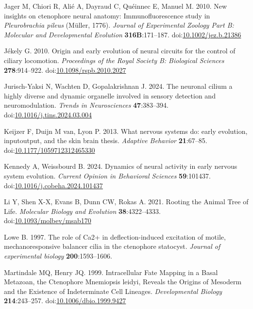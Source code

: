 \documentclass[
  11pt,
]{article}
\newlength{\cslhangindent}
\newenvironment{CSLReferences}[2] %
 {\begin{list}{}{%
  \setlength{\itemindent}{0pt}
  \setlength{\leftmargin}{0pt}
  \setlength{\parsep}{0pt}
  \ifodd #1
   \setlength{\leftmargin}{\cslhangindent}
   \setlength{\itemindent}{-1\cslhangindent}
  \fi
  \setlength{\itemsep}{#2\baselineskip}}}
 {\end{list}}
\begin{document}
\begin{CSLReferences}{1}{0}
Jager M, Chiori R, Alié A, Dayraud C, Quéinnec E, Manuel M. 2010. New
insights on ctenophore neural anatomy: Immunofluorescence study in
{\emph{Pleurobrachia pileus}} (Müller, 1776). \emph{Journal of
Experimental Zoology Part B: Molecular and Developmental Evolution}
\textbf{316B}:171--187.
doi:\href{https://doi.org/10.1002/jez.b.21386}{10.1002/jez.b.21386}

Jékely G. 2010. Origin and early evolution of neural circuits for the
control of ciliary locomotion. \emph{Proceedings of the Royal Society B:
Biological Sciences} \textbf{278}:914--922.
doi:\href{https://doi.org/10.1098/rspb.2010.2027}{10.1098/rspb.2010.2027}

Jurisch-Yaksi N, Wachten D, Gopalakrishnan J. 2024. The neuronal cilium
{\textendash} a highly diverse and dynamic organelle involved in sensory
detection and neuromodulation. \emph{Trends in Neurosciences}
\textbf{47}:383--394.
doi:\href{https://doi.org/10.1016/j.tins.2024.03.004}{10.1016/j.tins.2024.03.004}

Keijzer F, Duijn M van, Lyon P. 2013. What nervous systems do: early
evolution, input{\textendash}output, and the skin brain thesis.
\emph{Adaptive Behavior} \textbf{21}:67--85.
doi:\href{https://doi.org/10.1177/1059712312465330}{10.1177/1059712312465330}

Kennedy A, Weissbourd B. 2024. Dynamics of neural activity in early
nervous system evolution. \emph{Current Opinion in Behavioral Sciences}
\textbf{59}:101437.
doi:\href{https://doi.org/10.1016/j.cobeha.2024.101437}{10.1016/j.cobeha.2024.101437}

Li Y, Shen X-X, Evans B, Dunn CW, Rokas A. 2021. Rooting the Animal Tree
of Life. \emph{Molecular Biology and Evolution} \textbf{38}:4322--4333.
doi:\href{https://doi.org/10.1093/molbev/msab170}{10.1093/molbev/msab170}

Lowe B. 1997. The role of Ca2+ in deflection-induced excitation of
motile, mechanoresponsive balancer cilia in the ctenophore statocyst.
\emph{Journal of experimental biology} \textbf{200}:1593--1606.

Martindale MQ, Henry JQ. 1999. Intracellular Fate Mapping in a Basal
Metazoan, the Ctenophore Mnemiopsis leidyi, Reveals the Origins of
Mesoderm and the Existence of Indeterminate Cell Lineages.
\emph{Developmental Biology} \textbf{214}:243--257.
doi:\href{https://doi.org/10.1006/dbio.1999.9427}{10.1006/dbio.1999.9427}


\end{CSLReferences}
\end{document}

